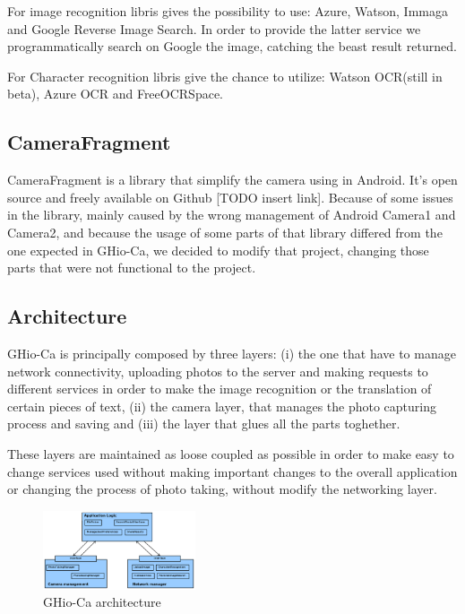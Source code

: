 For image recognition libris gives the possibility to use: Azure, Watson, Immaga 
and Google Reverse Image Search. In order to provide the latter service we 
programmatically search on Google the image, catching the beast result returned.

For Character recognition libris give the chance to utilize: Watson OCR(still in 
beta), Azure OCR and FreeOCRSpace.

\subsection{CameraFragment}
CameraFragment is a library that simplify the camera using in Android. It's 
open source and freely available on Github [TODO insert link]. Because of some
issues in the library, mainly caused by the wrong management of Android Camera1 
and Camera2, and because the usage of some parts of that library differed from 
the one expected in GHio-Ca, we decided to modify that project, changing those 
parts that were not functional to the project.

\subsection{Architecture}
GHio-Ca is principally composed by three layers: (i) the one that have to manage
network connectivity, uploading photos to the server and making requests to 
different services in order to make the image recognition or the translation of 
certain pieces of text, (ii) the camera layer, that manages the photo 
capturing process and saving and (iii) the layer that glues all the parts 
toghether. 

These layers are maintained as loose coupled as possible in order to make 
easy to change services used without making important changes to the overall 
application or changing the process of photo taking, without modify the 
networking layer.

\begin{figure}[h]
    \centering
    \includegraphics[width=0.40\textwidth]{../img/ghioca_macro_component}
    \caption{GHio-Ca architecture}
    \label{fig:architecture}
\end{figure}

